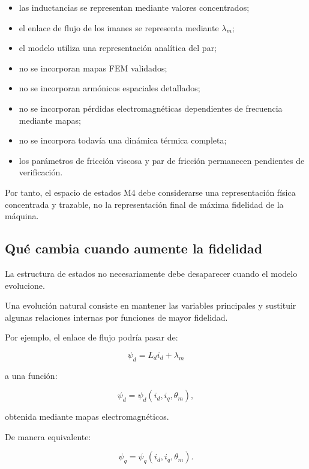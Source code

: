 \begin{itemize}
    \item las inductancias se representan mediante valores concentrados;
    \item el enlace de flujo de los imanes se representa mediante $\lambda_m$;
    \item el modelo utiliza una representación analítica del par;
    \item no se incorporan mapas FEM validados;
    \item no se incorporan armónicos espaciales detallados;
    \item no se incorporan pérdidas electromagnéticas dependientes de frecuencia mediante mapas;
    \item no se incorpora todavía una dinámica térmica completa;
    \item los parámetros de fricción viscosa y par de fricción permanecen pendientes de verificación.
\end{itemize}

Por tanto, el espacio de estados M4 debe considerarse una representación física concentrada y trazable, no la representación final de máxima fidelidad de la máquina.

\subsection{Qué cambia cuando aumente la fidelidad}

La estructura de estados no necesariamente debe desaparecer cuando el modelo evolucione.

Una evolución natural consiste en mantener las variables principales y sustituir algunas relaciones internas por funciones de mayor fidelidad.

Por ejemplo, el enlace de flujo podría pasar de:

\begin{equation}
\psi_d=L_di_d+\lambda_m
\end{equation}

a una función:

\begin{equation}
\psi_d
=
\psi_d(i_d,i_q,\theta_m),
\end{equation}

obtenida mediante mapas electromagnéticos.

De manera equivalente:

\begin{equation}
\psi_q
=
\psi_q(i_d,i_q,\theta_m).
\end{equation}

